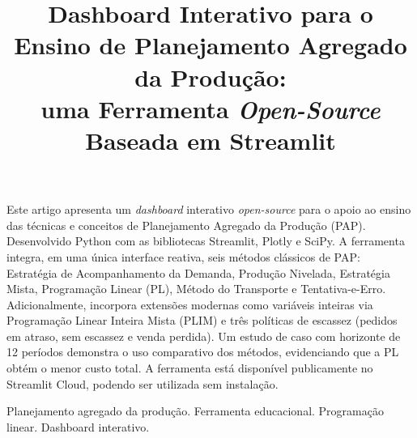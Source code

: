 \documentclass[a4paper,11pt]{article}
\begin{document}
\title{Dashboard Interativo para o Ensino de Planejamento Agregado da Produção:\\
uma Ferramenta \textit{Open-Source} Baseada em Streamlit}

\maketitle
\thispagestyle{fancy}

\author{
}


\author{
}


\vspace{8mm}
\begin{resumo}
Este artigo apresenta um \textit{dashboard} interativo \textit{open-source} para o apoio ao  ensino das técnicas e conceitos de  Planejamento Agregado da Produção (PAP). Desenvolvido Python com as bibliotecas Streamlit, Plotly e SciPy. A ferramenta integra, em uma única interface reativa, seis métodos clássicos de PAP: Estratégia de Acompanhamento da Demanda, Produção Nivelada, Estratégia Mista, Programação Linear (PL), Método do Transporte e Tentativa-e-Erro. Adicionalmente, incorpora extensões modernas como variáveis inteiras via Programação Linear Inteira Mista
(PLIM) e três políticas de escassez (pedidos em atraso, sem escassez e venda perdida).
Um estudo de caso com horizonte de 12 períodos demonstra o uso comparativo dos métodos,
evidenciando que a PL obtém o menor custo total. A ferramenta está disponível publicamente no Streamlit Cloud, podendo ser utilizada sem instalação.
\end{resumo}

\bigskip
\begin{palchaves}
Planejamento agregado da produção. Ferramenta educacional. Programação linear. Dashboard interativo. 

\bigskip
{}
\end{palchaves}

\vspace{8mm}
\end{document}
